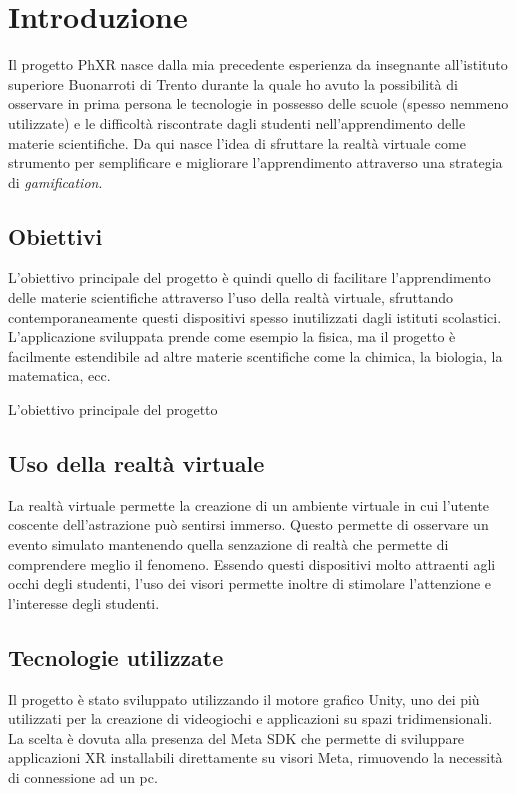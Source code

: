 \chapter{Introduzione}
\label{cha:introduzione}

Il progetto PhXR nasce dalla mia precedente esperienza da insegnante all'istituto
superiore Buonarroti di Trento durante la quale ho avuto la possibilità di
osservare in prima persona le tecnologie in possesso delle scuole (spesso nemmeno
utilizzate) e le difficoltà riscontrate dagli studenti nell'apprendimento delle
materie scientifiche. Da qui nasce l'idea di sfruttare la realtà virtuale come strumento
per semplificare e migliorare l'apprendimento attraverso
una strategia di \textit{gamification}.

\section{Obiettivi}
\label{sec:introduzione_obiettivi}

L'obiettivo principale del progetto è quindi quello di facilitare l'apprendimento
delle materie scientifiche attraverso l'uso della realtà virtuale, sfruttando
contemporaneamente questi dispositivi spesso inutilizzati dagli istituti
scolastici. L'applicazione sviluppata prende come esempio la fisica, ma il
progetto è facilmente estendibile ad altre materie scentifiche come la chimica, la
biologia, la matematica, ecc.

L'obiettivo principale del progetto 

\section{Uso della realtà virtuale}
\label{sec:introduzione_uso_realtà_virtuale}

La realtà virtuale permette la creazione di un ambiente virtuale in cui l'utente
coscente dell'astrazione può sentirsi immerso. Questo permette di osservare un evento
simulato mantenendo quella senzazione di realtà che permette di comprendere meglio
il fenomeno. Essendo questi dispositivi molto attraenti agli occhi degli
studenti, l'uso dei visori permette inoltre di stimolare l'attenzione e l'interesse
degli studenti.

\section{Tecnologie utilizzate}
\label{sec:introduzione_tecnologie_utilizzate}

Il progetto è stato sviluppato utilizzando il motore grafico Unity, uno dei più utilizzati
per la creazione di videogiochi e applicazioni su spazi tridimensionali. La
scelta è dovuta alla presenza del Meta SDK che permette di sviluppare
applicazioni XR installabili direttamente su visori Meta, rimuovendo la necessità
di connessione ad un pc.